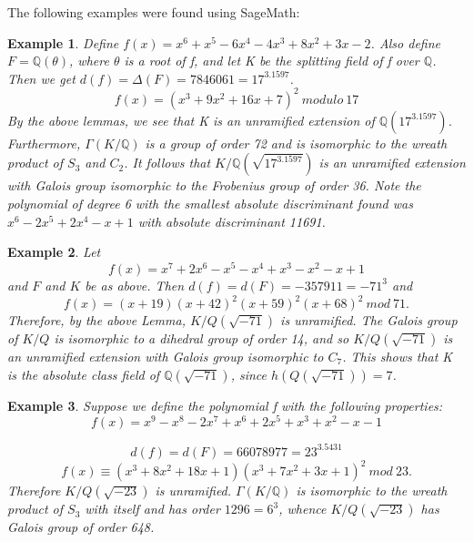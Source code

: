 \documentclass[preprint,12pt,reqno]{elsarticle}
\newtheorem{example}{Example}
\begin{document}
The following examples were found using SageMath:
\begin{example}
Define $f(x)=x^6 + x^5 - 6x^4 - 4x^3 + 8x^2 + 3x - 2$. Also define $F=\mathbb{Q}(\theta)$, where $\theta$ is a root of f, and let K be the splitting field of f over $\mathbb{Q}$. Then we get $d(f)=\Delta(F)=7846061=17^3.1597$. 
\begin{equation}
   f(x)= (x^3 + 9x^2 + 16x + 7)^2\:modulo\:17
\end{equation}
By the above lemmas, we see that K is an unramified extension of $\mathbb{Q}(17^3.1597)$. Furthermore, $\Gamma(K/\mathbb{Q})$ is a group of order 72 and is isomorphic to the wreath product of $S_3$ and $C_2$. It follows that $K/\mathbb{Q}(\sqrt{17^3.1597})$ is an unramified extension with Galois group isomorphic to the Frobenius group of order 36.
Note the polynomial of degree 6 with the smallest absolute discriminant found was $x^6 - 2x^5 + 2x^4 - x + 1$ with absolute discriminant 11691.
\end{example}
\begin{example}
 Let \begin{equation}
     f(x)=x^7 + 2x^6 - x^5 - x^4 + x^3 - x^2 - x + 1
 \end{equation}and $F$ and $K$ be as above.
Then $d(f)=d(F)=-357911=-71^{3}$ and
\begin{equation}
    f(x)=(x + 19)(x + 42)^2 (x + 59)^2(x + 68)^2\:mod\:71.
\end{equation}
Therefore, by the above Lemma, $K/Q(\sqrt{-71})$ is unramified. The Galois group of $K/Q$
is isomorphic to a dihedral group of order 14, and so $K/Q(\sqrt{-71})$
is an unramified extension with Galois group isomorphic to $C_7$.
This shows that K is the absolute class field of $\mathbb{Q}(\sqrt{-71})$, since $h(Q(\sqrt{-71}))=7$.
\end{example}
\begin{example}
    Suppose we define the polynomial f with the following properties: \begin{equation}
        f(x) =x^9 - x^8 - 2x^7 + x^6 + 2x^5 + x^3 + x^2 - x - 1
    \end{equation} \par
    \begin{equation}
        d(f)=d(F)=66078977=23^3.5431
    \end{equation} 
    \begin{equation}
        f(x)\equiv(x^3 + 8x^2 + 18x + 1)(x^3 + 7x^2 + 3x + 1)^2\:mod\:23.
    \end{equation}
Therefore  $K/Q(\sqrt{-23})$ is unramified. $\Gamma(K/\mathbb{Q})$ is isomorphic to the wreath product of $S_3$ with itself and has order $1296=6^3$, whence $K/Q(\sqrt{-23})$ has Galois group of order 648.
\end{example}
\end{document}

